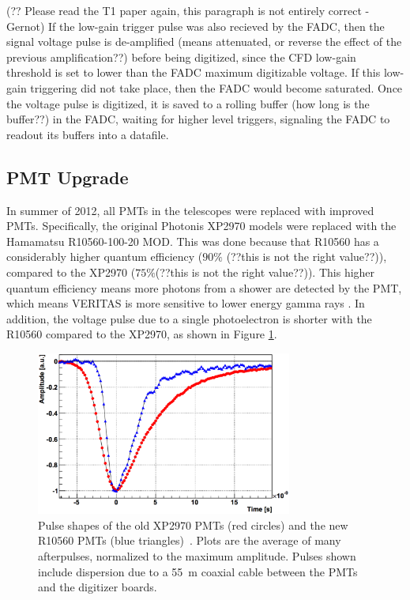 {\color{red}(?? Please read the T1 paper again, this paragraph is not entirely correct -Gernot)}
If the low-gain trigger pulse was also recieved by the FADC, then the signal voltage pulse is de-amplified {\color{red}(means attenuated, or reverse the effect of the previous amplification??)} before being digitized, since the CFD low-gain threshold is set to lower than the FADC maximum digitizable voltage.
If this low-gain triggering did not take place, then the FADC would become saturated.
Once the voltage pulse is digitized, it is saved to a rolling buffer {\color{red}(how long is the buffer??)} in the FADC, waiting for higher level triggers, signaling the FADC to readout its buffers into a datafile.

\subsection{PMT Upgrade}
In summer of 2012, all PMTs in the telescopes were replaced with improved PMTs.
Specifically, the original Photonis XP2970 models were replaced with the Hamamatsu R10560-100-20 MOD.
This was done because that R10560 has a considerably higher quantum efficiency (\nicetilde$90\%$ {\color{red}(??this is not the right value??)}), compared to the XP2970 (\nicetilde$75\%${\color{red}(??this is not the right value??)}).
This higher quantum efficiency means more photons from a shower are detected by the PMT, which means VERITAS is more sensitive to lower energy gamma rays \cite{pmtmodels}.
In addition, the voltage pulse due to a single photoelectron is shorter with the R10560 compared to the XP2970, as shown in Figure \ref{fig:pmt_pulse_widths}.

\begin{figure}[ht]
  \centering
  \includegraphics[width=0.75\textwidth]{images/pmt_models_pulsewidths.eps}
  \caption[Pulse Shapes]{
    Pulse shapes of the old XP2970 PMTs (red circles) and the new R10560 PMTs (blue triangles)~\cite{pmtmodels}.
    Plots are the average of many afterpulses, normalized to the maximum amplitude.
    Pulses shown include dispersion due to a \nicetilde{}\SI{55}{m} coaxial cable between the PMTs and the digitizer boards.}
  \label{fig:pmt_pulse_widths}
\end{figure}

